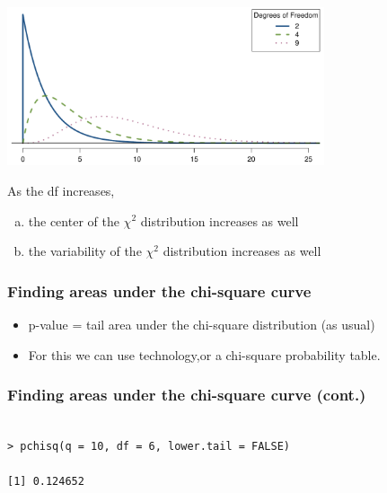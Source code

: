 \documentclass[notes,11pt, aspectratio=169]{beamer}
\begin{document}
\begin{frame}
\frametitle{}


\begin{center}
\includegraphics[width=0.7\textwidth]{graphs/chiSquareDistributionWithInceasingDF}
\end{center}

As the df increases,
\begin{enumerate}[(a)]
\item the center of the $\chi^2$ distribution increases as well
\item the variability of the $\chi^2$ distribution increases as well
\end{enumerate}

\end{frame}


\begin{frame}[fragile]
\frametitle{Finding areas under the chi-square curve}

\begin{itemize}

\item p-value = tail area under the chi-square distribution (as usual)

\pause

\item For this we can use technology,or a chi-square probability table.

\end{itemize}

\end{frame}


\begin{frame}[fragile]
\frametitle{Finding areas under the chi-square curve (cont.)}


\pause

\begin{verbatim}

> pchisq(q = 10, df = 6, lower.tail = FALSE)

[1] 0.124652

\end{verbatim}

\end{frame}
\end{document}
